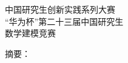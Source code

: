 \documentclass[12pt,a4paper]{article}
\theoremstyle{plain}
\theoremstyle{definition}
\begin{document}

\setcounter{page}{1}

\begin{center}
\vspace*{0.6cm}
{\heitibf\fontsize{18pt}{24pt}\selectfont 中国研究生创新实践系列大赛}\\[6pt]
{\heitibf\fontsize{22pt}{28pt}\selectfont “华为杯”第二十三届中国研究生}\\[6pt]
{\heitibf\fontsize{22pt}{28pt}\selectfont 数学建模竞赛}
\end{center}
\vspace{0.9cm}
\hfill
\uline{}
\vspace{0.9cm}
\begin{center}{\heitibf\Large 摘\quad 要：}\end{center}
\vspace{0.1cm}



\newpage








\end{document}
